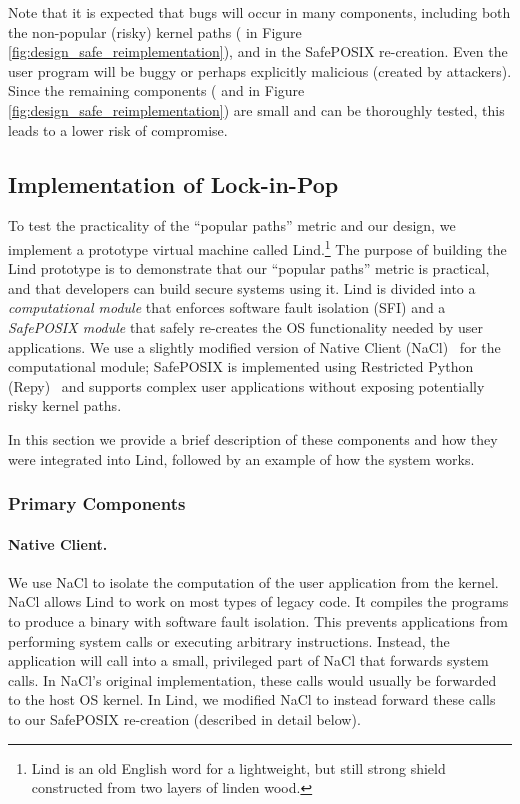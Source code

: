 Note that it is expected that bugs will occur in many components, including both the
non-popular (risky) kernel paths ( in Figure \ref{fig:design_safe_reimplementation}),
and in the SafePOSIX re-creation. Even the user program will be buggy or
perhaps explicitly malicious (created by attackers).
Since the remaining components ( and  in Figure \ref{fig:design_safe_reimplementation})
are small and can be thoroughly tested, this leads to a lower risk of compromise.

\subsection{Implementation of Lock-in-Pop}
\label{implementation}

To test the practicality of the ``popular paths'' metric and our \lip design,
we implement a prototype virtual machine
called Lind.\footnote{\scriptsize Lind is an old English word for a lightweight,
but still strong shield constructed from two layers of linden wood.} The purpose of building the Lind
prototype is to demonstrate that our ``popular paths'' metric is practical, and
that developers can build secure systems using it.
Lind is divided into a \emph{computational module} that enforces software fault isolation (SFI) and a
\emph{SafePOSIX module} that safely re-creates the OS functionality needed by user
applications. We use a slightly modified version of Native Client
(NaCl)~\cite{NaCl-09} for the computational module; SafePOSIX is
implemented using Restricted Python (Repy)~\cite{Repy-10} and supports
complex user applications without exposing potentially risky kernel paths.

In this section we provide a brief description of these components and how they
were integrated into Lind, followed by an example of how the system works.

\subsubsection{Primary Components}

\paragraph{Native Client.}
We use NaCl to isolate the computation of the user application
from the kernel. NaCl allows Lind to work on most types of legacy code.
It compiles the programs to produce a binary with software fault isolation.
This prevents applications from performing system calls
or executing arbitrary instructions.
Instead, the application will call into a small, privileged
part of NaCl that forwards system calls. In NaCl's original implementation,
these calls would usually be forwarded to the host OS kernel. In Lind, we
modified NaCl to instead forward these calls to our SafePOSIX re-creation
(described in detail below).

